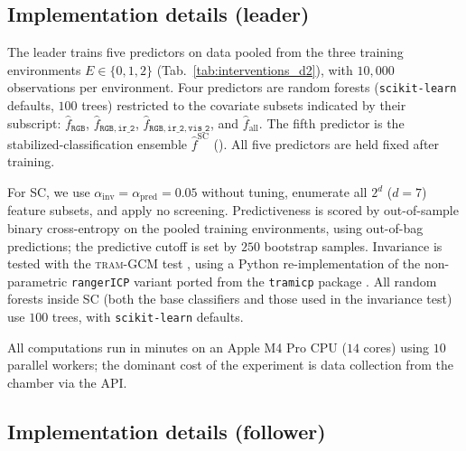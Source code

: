 \subsection{Implementation details (leader)} \label{app:implementation_details_leader}


The leader trains five predictors on data pooled from the three training environments $E \in \{0, 1, 2\}$ (Tab.~\ref{tab:interventions_d2}), with $10{,}000$ observations per environment. Four predictors are random forests (\texttt{scikit-learn} \citep{scikit-learn} defaults, $100$ trees) restricted to the covariate subsets indicated by their subscript: $\hat{f}_{\mathtt{RGB}}$, $\hat{f}_{\mathtt{RGB}, \mathtt{ir\_2}}$, $\hat{f}_{\mathtt{RGB}, \mathtt{ir\_2}, \mathtt{vis\_2}}$, and $\hat{f}_\mathrm{all}$. The fifth predictor is the stabilized-classification ensemble $\hat{f}^\mathrm{SC}$ (). All five predictors are held fixed after training.
 
For SC, we use $\alpha_\mathrm{inv} = \alpha_\mathrm{pred} = 0.05$ without tuning, enumerate all $2^d$ ($d=7$) feature subsets, and apply no screening. Predictiveness is scored by out-of-sample binary cross-entropy on the pooled training environments, using out-of-bag predictions; the predictive cutoff is set by $250$ bootstrap samples. Invariance is tested with the \textsc{tram}-GCM test \citep{kookModelbasedCausalFeature2023}, using a Python re-implementation of the non-parametric \texttt{rangerICP} variant ported from the \texttt{tramicp} package \citep{tramicp}. All random forests inside SC (both the base classifiers and those used in the invariance test) use $100$ trees, with \texttt{scikit-learn} defaults.

All computations run in minutes on an Apple M4 Pro CPU ($14$ cores) using $10$ parallel workers; the dominant cost of the experiment is data collection from the chamber via the API.
 



\subsection{Implementation details (follower)} \label{app:implementation_details_follower}

